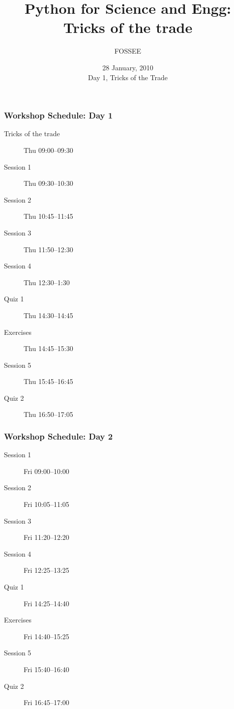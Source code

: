 \documentclass[14pt,compress]{beamer}
\title[Tricks of the trade]{Python for Science and Engg: Tricks of the trade}
\author[FOSSEE] {FOSSEE}
\institute[IIT Bombay] {Department of Aerospace Engineering\\IIT Bombay}
\date[] {28 January, 2010\\Day 1, Tricks of the Trade}
\begin{document}
\begin{frame}
  \maketitle
\end{frame}


\begin{frame}
  \frametitle{Workshop Schedule: Day 1}
  \begin{description}
	\item[Tricks of the trade] Thu 09:00--09:30
	\item[Session 1] Thu 09:30--10:30
	\item[Session 2] Thu 10:45--11:45
	\item[Session 3] Thu 11:50--12:30
	\item[Session 4] Thu 12:30--1:30
        \item[Quiz 1] Thu 14:30--14:45
        \item[Exercises] Thu 14:45--15:30
        \item[Session 5] Thu 15:45--16:45
        \item[Quiz 2] Thu 16:50--17:05
  \end{description}
\end{frame}

\begin{frame}
  \frametitle{Workshop Schedule: Day 2}
  \begin{description}
	\item[Session 1] Fri 09:00--10:00
	\item[Session 2] Fri 10:05--11:05
	\item[Session 3] Fri 11:20--12:20
	\item[Session 4] Fri 12:25--13:25
        \item[Quiz 1]  Fri 14:25--14:40
        \item[Exercises] Fri 14:40--15:25
        \item[Session 5] Fri 15:40--16:40
        \item[Quiz 2]  Fri 16:45--17:00
  \end{description}
\end{frame}
\end{document}
